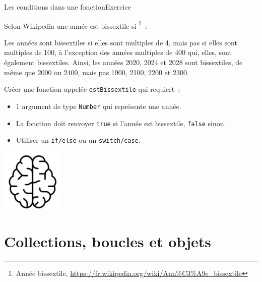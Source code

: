 \documentclass{beamer}
\begin{document}
    \begin{frame}{Les conditions dans une fonction}{Exercice \execcounterdispinc{}}
        \begin{footnotesize}
            Selon Wikipedia une année est bissextile si \footnote{Année bissextile, \url{https://fr.wikipedia.org/wiki/Ann\%C3\%A9e_bissextile}}~:
            \begin{textit}
                Les années sont bissextiles si elles sont multiples de 4, mais pas si elles sont multiples de 100, à l'exception des années multiples de 400 qui, elles, sont également bissextiles.
                Ainsi, les années 2020, 2024 et 2028 sont bissextiles, de même que 2000 ou 2400, mais pas 1900, 2100, 2200 et 2300.
            \end{textit}
            \bigbreak
            Créer une fonction appelée \lstinline{estBissextile} qui requiert~:
            \begin{itemize}
                \item 1 argument de type \lstinline{Number} qui représente une année.
                \item La fonction doit renvoyer \lstinline{true} si l'année est bissextile, \lstinline{false} sinon.
                \item Utiliser un \lstinline{if/else} ou un \lstinline{switch/case}.
            \end{itemize}
        \end{footnotesize}
        \bigbreak
        \centering
        \includegraphics[width=3cm]{image/intelligence}
    \end{frame}


    \section{Collections, boucles et objets}\label{sec:collections-loops-objects}
\end{document}
